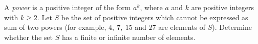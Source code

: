 A \textit{power} is a positive integer of the form $a^k$, where $a$ and $k$ are positive integers with $k\geq 2$. Let $S$ be the set of positive integers which cannot be expressed as sum of two powers (for example, $4,\ 7,\ 15$ and $27$ are elements of $S$). Determine whether the set $S$ has a finite or infinite number of elements.